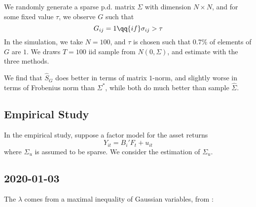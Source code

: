     We randomly generate a sparse p.d. matrix \(\Sigma\) with dimension \(N\times N\), and for some fixed value \(\tau\), we observe \(G\) such that \begin{equation}
        G_{ij} = 1 \qq{if} \sigma_{ij} > \tau 
    \end{equation}
    In the simulation, we take \(N = 100\), and \(\tau\) is chosen such that 0.7\% of elements of \(G\) are \(1\). We draws \(T = 100\) iid sample from \(N(0,\Sigma)\), and estimate with the three methods.

    We find that \(\hat{S}_{G}\) does better in terms of matrix \(1\)-norm, and slightly worse in terms of Frobenius norm than \(\Sigma^{*}\), while both do much better than sample \(\hat{\Sigma}\). 


    \subsection{Empirical Study}
    In the empirical study, suppose a factor model for the asset returns
    \begin{equation*}
        Y_{it} = B_{i}'F_{t} + u_{it}
    \end{equation*}
    where \(\Sigma_{u}\) is assumed to be sparse. We consider the estimation of \(\Sigma_{u}\). 
    
\subsection{2020-01-03}
    The \(\lambda\) comes from a maximal inequality of Gaussian variables, from \cite{buhlmann2011StatisticsHighdimensional}:
    \begin{equation*}
        
    \end{equation*}
